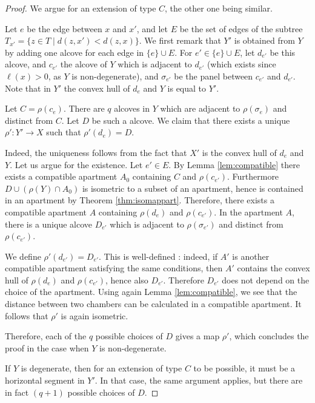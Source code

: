 \documentclass[a4paper, 11pt]{article}
\theoremstyle{plain}
\theoremstyle{definition}
\theoremstyle{remark}
\begin{document}
\begin{proof}
We argue for an extension of type $C$, the other one being similar.

Let $e$ be the edge between $x$ and $x'$, and let $E$ be the set of edges of the subtree $T_{x'}=\{z\in T\mid d(z,x')<d(z,x)\}$. We first remark that $Y'$ is obtained from $Y$ by adding one alcove for each edge in $\{e\}\cup E$. For $e'\in \{e\}\cup E$, let $d_{e'}$ be this alcove, and $c_{e'}$ the alcove of $Y$ which is adjacent to $d_{e'}$ (which exists since $\ell(x)>0$, as $Y$ is non-degenerate), and $\sigma_{e'}$ be the panel between $c_{e'}$ and $d_{e'}$. Note that in $Y'$ the convex hull of $d_e$ and $Y$ is equal to $Y'$. 

Let $C=\rho(c_e)$. There are $q$ alcoves in $Y$ which are adjacent to $\rho(\sigma_e)$ and distinct from $C$. Let $D$ be such a alcove. We claim that there exists a unique $\rho':Y'\to X$ such that $\rho'(d_e)=D$. 

Indeed, the uniqueness follows from the fact that $X'$ is the convex hull of $d_e$ and $Y$. Let us argue for the existence. Let $e'\in E$. By Lemma \ref{lem:compatible} there exists a compatible apartment $A_0$ containing $C$ and $\rho(c_{e'})$. Furthermore $D\cup (\rho(Y)\cap A_0)$ is isometric to a subset of an apartment, hence is contained in an apartment by Theorem \ref{thm:isomappart}. Therefore, there exists a
 compatible apartment $A$ containing $\rho(d_e)$ and $\rho(c_{e'})$. In the apartment $A$, there is a unique alcove $D_{e'}$ which is adjacent to $\rho(\sigma_{e'})$ and distinct from $\rho(c_{e'})$. 

 We define $\rho'(d_{e'})=D_{e'}$. This is well-defined : indeed, if $A'$ is another compatible apartment satisfying the same conditions, then $A'$ contains the convex hull of $\rho(d_e)$ and $\rho(c_{e'})$, hence also $D_{e'}$. Therefore $D_{e'}$ does not depend on the choice of the apartment. Using again Lemma \ref{lem:compatible}, we see that the distance between two chambers can be calculated in a compatible apartment. It follows that $\rho'$ is again isometric. 
 
 Therefore, each of the $q$ possible choices of $D$ gives a map $\rho'$, which concludes the proof in the case when $Y$ is non-degenerate.

 If $Y$ is degenerate, then for an extension of type $C$ to be possible, it must be a horizontal segment in $Y'$. In that case, the same argument applies, but there are in fact $(q+1)$ possible choices of $D$.

 
 
\end{proof}
\end{document}
